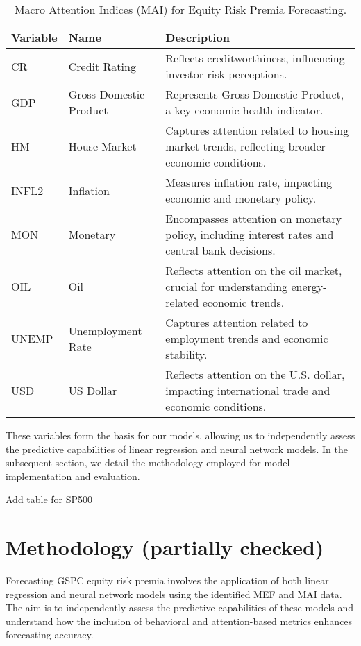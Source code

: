 \documentclass{article}
\begin{document}
\begin{table}[H]
\centering
\begin{tabular}{|l|l|p{7.5cm}|}
\hline
\textbf{Variable} & \textbf{Name} & \textbf{Description} \\
\hline
CR & Credit Rating & Reflects creditworthiness, influencing investor risk perceptions. \\
GDP & Gross Domestic Product & Represents Gross Domestic Product, a key economic health indicator. \\
HM & House Market & Captures attention related to housing market trends, reflecting broader economic conditions. \\
INFL2 & Inflation & Measures inflation rate, impacting economic and monetary policy. \\
MON & Monetary & Encompasses attention on monetary policy, including interest rates and central bank decisions. \\
OIL & Oil & Reflects attention on the oil market, crucial for understanding energy-related economic trends. \\
UNEMP & Unemployment Rate & Captures attention related to employment trends and economic stability. \\
USD & US Dollar & Reflects attention on the U.S. dollar, impacting international trade and economic conditions. \\
\hline
\end{tabular}
\caption{Macro Attention Indices (MAI) for Equity Risk Premia Forecasting.}
\end{table}

These variables form the basis for our models, allowing us to independently assess the predictive capabilities of linear regression and neural network models. In the subsequent section, we detail the methodology employed for model implementation and evaluation.

Add table for SP500

\newpage

\section{Methodology (partially checked)}

Forecasting GSPC equity risk premia involves the application of both linear regression and neural network models using the identified MEF and MAI data. The aim is to independently assess the predictive capabilities of these models and understand how the inclusion of behavioral and attention-based metrics enhances forecasting accuracy.
\end{document}
